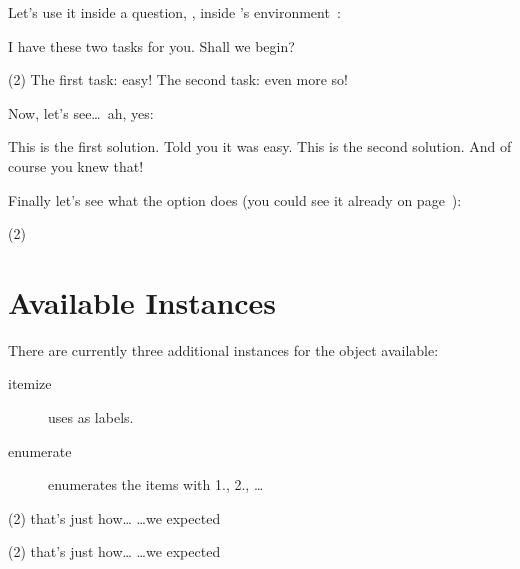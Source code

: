 \documentclass{tasks-manual}
\begin{document}
Let's use it inside a question, \ie, inside 's 
environment~\cite{pkg:xsim}:
\begin{example}
  \begin{exercise}
    I have these two tasks for you. Shall we begin?
    \begin{tasks}(2)
      \task The first task: easy!
      \task The second task: even more so!
    \end{tasks}
  \end{exercise}
  \begin{solution}[print]
    Now, let's see\ldots\ ah, yes:
    \begin{tasks}
      \task This is the first solution. Told you it was easy.
      \task This is the second solution. And of course you knew that!
    \end{tasks}
  \end{solution}
\end{example}

Finally let's see what the  option does (you could see it
already on page~\pageref{debug}):
\begin{example}
  \begin{tasks}(2)
    \task \Sample
    \task \Sample
  \end{tasks}
\end{example}

\section{Available Instances}\label{sec:tasks:instances}
There are currently three additional instances for the  object
available:
\begin{description}
  \item[itemize] uses  as labels.
  \item[enumerate] enumerates the items with 1., 2., \ldots
\end{description}
\begin{example}
  \begin{tasks}[style=itemize](2)
    \task that's just how\ldots
    \task \ldots we expected
  \end{tasks}
  \begin{tasks}[style=enumerate](2)
    \task that's just how\ldots
    \task \ldots we expected
  \end{tasks}
\end{example}
\end{document}

